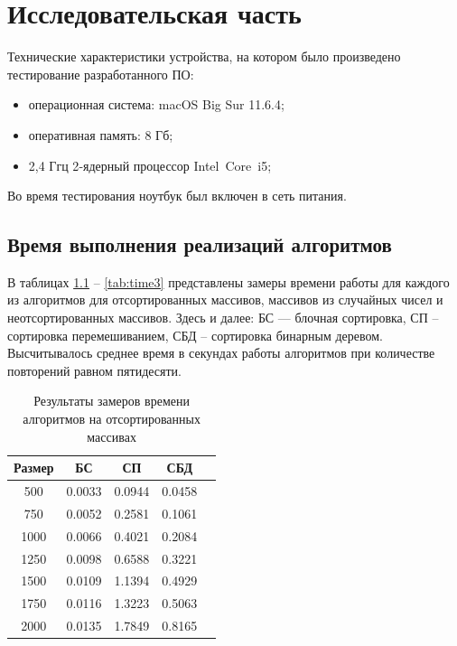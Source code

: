 \chapter{Исследовательская часть}

Технические характеристики устройства, на котором было произведено тестирование разработанного ПО: 

\begin{itemize}
	\item операционная система: macOS Big Sur 11.6.4;
	\item оперативная память: 8 Гб;
	\item 2,4 Ггц 2‑ядерный процессор Intel Core i5;
\end{itemize}

Во время тестирования ноутбук был включен в сеть питания.

\section{Время выполнения реализаций алгоритмов}

В таблицах \ref{tab:time1} -- \ref{tab:time3} представлены замеры времени работы для каждого из алгоритмов для отсортированных массивов, массивов из случайных чисел и неотсортированных массивов. Здесь и далее: БС — блочная сортировка, СП -- сортировка перемешиванием, СБД -- сортировка бинарным деревом. Высчитывалось среднее время в секундах работы алгоритмов при количестве повторений равном пятидесяти.

\begin{table}[h]
	\begin{center}
		\caption{\label{tab:time1}Результаты замеров времени алгоритмов на отсортированных массивах}
		\begin{tabular}{|c|c|c|c|c|}
		\hline
		Размер & БС &  СП & СБД \\
		\hline
		500  & 0.0033 & 0.0944 & 0.0458\\
		\hline
		750  & 0.0052 & 0.2581 & 0.1061\\
		\hline
		1000  & 0.0066 & 0.4021 & 0.2084 \\
		\hline
		1250  & 0.0098 & 0.6588 & 0.3221 \\
		\hline
		1500  & 0.0109 & 1.1394 & 0.4929 \\ 
		\hline
		1750  & 0.0116 & 1.3223 & 0.5063 \\
		\hline
		2000  & 0.0135 & 1.7849 & 0.8165 \\
		\hline
		\end{tabular}
	\end{center}
\end{table}

